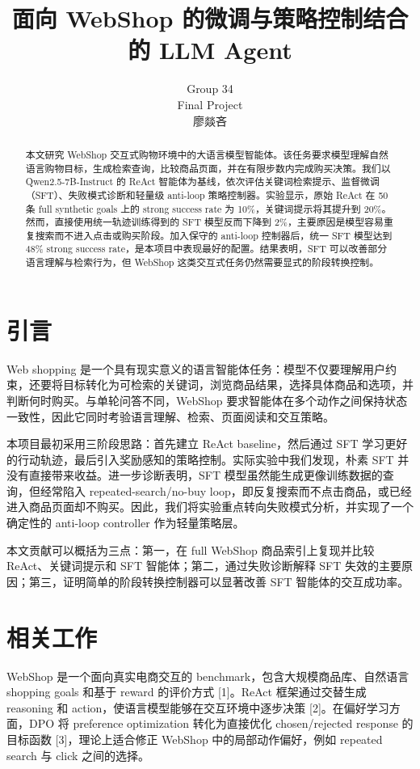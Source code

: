 \documentclass[11pt]{article}
\title{面向 WebShop 的微调与策略控制结合的 LLM Agent}
\author{
  Group 34 \\
  Final Project \\
  廖燚吝 \quad 25210980075
}
\begin{document}
\maketitle

\begin{abstract}
本文研究 WebShop 交互式购物环境中的大语言模型智能体。该任务要求模型理解自然语言购物目标，生成检索查询，比较商品页面，并在有限步数内完成购买决策。我们以 Qwen2.5-7B-Instruct 的 ReAct 智能体为基线，依次评估关键词检索提示、监督微调（SFT）、失败模式诊断和轻量级 anti-loop 策略控制器。实验显示，原始 ReAct 在 50 条 full synthetic goals 上的 strong success rate 为 10\%，关键词提示将其提升到 20\%。然而，直接使用统一轨迹训练得到的 SFT 模型反而下降到 2\%，主要原因是模型容易重复搜索而不进入点击或购买阶段。加入保守的 anti-loop 控制器后，统一 SFT 模型达到 48\% strong success rate，是本项目中表现最好的配置。结果表明，SFT 可以改善部分语言理解与检索行为，但 WebShop 这类交互式任务仍然需要显式的阶段转换控制。
\end{abstract}

\section{引言}

Web shopping 是一个具有现实意义的语言智能体任务：模型不仅要理解用户约束，还要将目标转化为可检索的关键词，浏览商品结果，选择具体商品和选项，并判断何时购买。与单轮问答不同，WebShop 要求智能体在多个动作之间保持状态一致性，因此它同时考验语言理解、检索、页面阅读和交互策略。

本项目最初采用三阶段思路：首先建立 ReAct baseline，然后通过 SFT 学习更好的行动轨迹，最后引入奖励感知的策略控制。实际实验中我们发现，朴素 SFT 并没有直接带来收益。进一步诊断表明，SFT 模型虽然能生成更像训练数据的查询，但经常陷入 repeated-search/no-buy loop，即反复搜索而不点击商品，或已经进入商品页面却不购买。因此，我们将实验重点转向失败模式分析，并实现了一个确定性的 anti-loop controller 作为轻量策略层。

本文贡献可以概括为三点：第一，在 full WebShop 商品索引上复现并比较 ReAct、关键词提示和 SFT 智能体；第二，通过失败诊断解释 SFT 失效的主要原因；第三，证明简单的阶段转换控制器可以显著改善 SFT 智能体的交互成功率。

\section{相关工作}

WebShop 是一个面向真实电商交互的 benchmark，包含大规模商品库、自然语言 shopping goals 和基于 reward 的评价方式 [1]。ReAct 框架通过交替生成 reasoning 和 action，使语言模型能够在交互环境中逐步决策 [2]。在偏好学习方面，DPO 将 preference optimization 转化为直接优化 chosen/rejected response 的目标函数 [3]，理论上适合修正 WebShop 中的局部动作偏好，例如 repeated search 与 click 之间的选择。
\end{document}
